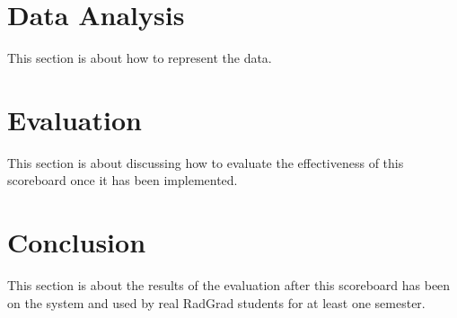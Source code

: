 \documentclass[english]{proposalnsf}
\begin{document}
  \section{Data Analysis}
  \label{sec:data-analysis}
  This section is about how to represent the data.

  \section{Evaluation}
  \label{sec:evaluation}
  This section is about discussing how to evaluate the effectiveness of this scoreboard once it has been implemented.

  \section{Conclusion}
  \label{sec:conclusion}
  This section is about the results of the evaluation after this scoreboard has been on the system and used by real RadGrad students for at least one semester.

  
  

  \appendix
\end{document}
